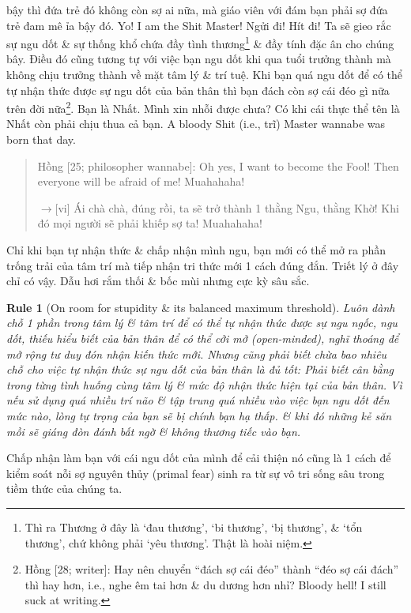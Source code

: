 \documentclass[12pt,twoside]{book}
\newtheorem{Rule}{Rule}
\begin{document}
bậy thì đứa trẻ đó không còn sợ ai nữa, mà giáo viên với đám bạn phải sợ đứa trẻ đam mê ỉa bậy đó. Yo! I am the Shit Master! Ngửi đi! Hít đi! Ta sẽ gieo rắc sự ngu dốt \& sự thống khổ chứa đầy tình thương\footnote{Thì ra Thương ở đây là `đau thương', `bi thương', `bị thương', \& `tổn thương', chứ không phải `yêu thương'. Thật là hoài niệm.} \& đầy tính đặc ân cho chúng bây. Điều đó cũng tương tự với việc bạn ngu dốt khi qua tuổi trưởng thành mà không chịu trưởng thành về mặt tâm lý \& trí tuệ. Khi bạn quá ngu dốt để có thể tự nhận thức được sự ngu dốt của bản thân thì bạn đách còn sợ cái đéo gì nữa trên đời nữa\footnote{{\sf Hồng [28; writer]}: Hay nên chuyển ``đách sợ cái đéo'' thành ``đéo sợ cái đách'' thì hay hơn, i.e., nghe êm tai hơn \& du dương hơn nhỉ? Bloody hell! I still suck at writing.}. Bạn là Nhất. Mình xin nhỗi được chưa? Có khi cái thực thể tên là Nhất còn phải chịu thua cả bạn. A bloody Shit (i.e., trĩ) Master wannabe was born that day.

\begin{quote}
	{\sf Hồng [25; philosopher wannabe]}: Oh yes, I want to become the Fool! Then everyone will be afraid of me! Muahahaha!
	
	{\sf[en]$\to$[vi]} Ái chà chà, đúng rồi, ta sẽ trở thành 1 thằng Ngu, thằng Khờ! Khi đó mọi người sẽ phải khiếp sợ ta! Muahahaha!
\end{quote}
Chỉ khi bạn tự nhận thức \& chấp nhận mình ngu, bạn mới có thể mở ra phần trống trải của tâm trí mà tiếp nhận tri thức mới 1 cách đúng đắn. Triết lý ở đây chỉ có vậy. Dẫu hơi rắm thối \& bốc mùi nhưng cực kỳ sâu sắc.

\begin{Rule}[On room for stupidity \& its balanced maximum threshold]
	Luôn dành chỗ 1 phần trong tâm lý \& tâm trí để có thể tự nhận thức được sự ngu ngốc, ngu dốt, thiếu hiểu biết của bản thân để có thể cởi mở (open-minded), nghĩ thoáng để mở rộng tư duy đón nhận kiến thức mới. Nhưng cũng phải biết chừa bao nhiêu chỗ cho việc tự nhận thức sự ngu dốt của bản thân là đủ tốt: Phải biết cân bằng trong từng tình huống cùng tâm lý \& mức độ nhận thức hiện tại của bản thân. Vì nếu sử dụng quá nhiều trí não \& tập trung quá nhiều vào việc bạn ngu dốt đến mức nào, lòng tự trọng của bạn sẽ bị chính bạn hạ thấp. \& khi đó những kẻ săn mồi sẽ giáng đòn đánh bất ngờ \& không thương tiếc vào bạn.
\end{Rule}
Chấp nhận làm bạn với cái ngu dốt của mình để cải thiện nó cũng là 1 cách để kiểm soát nỗi sợ nguyên thủy (primal fear) sinh ra từ sự vô tri sống sâu trong tiềm thức của chúng ta.
\end{document}
